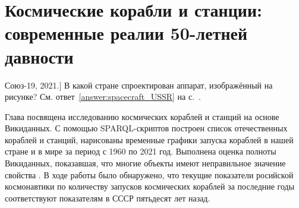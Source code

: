 \chapter{Космические корабли и станции: современные реалии 50-летней давности}
\label{ch:spacecraft-space-station}

\begin{marginfigure}[2.0cm]
{
	\setlength{\fboxsep}{0pt}%
	\setlength{\fboxrule}{1pt}%
}
\caption
[Союз-19, 2021.]
{
В какой стране спроектирован аппарат, изображённый на рисунке?
См. ответ~\ref{answer:spacecraft_USSR} на с.~\pageref{answer:spacecraft_USSR}.
}
\label{question:spacecraft_soyuz19}
\end{marginfigure}

Глава посвящена исследованию космических кораблей и станций на основе Викиданных. 
С помощью SPARQL-скриптов построен список отечественных кораблей и станций, 
нарисованы временные графики запуска кораблей в нашей стране и в мире за период с 1960 по 2021 год. 
Выполнена оценка полноты Викиданных, показавшая, 
что многие объекты имеют неправильное значение свойства 
. В ходе работы было обнаружено, что текущие показатели росийской космонавтики по количеству запусков космических кораблей за последние годы соответствуют показателям в СССР пятьдесят лет назад. 

